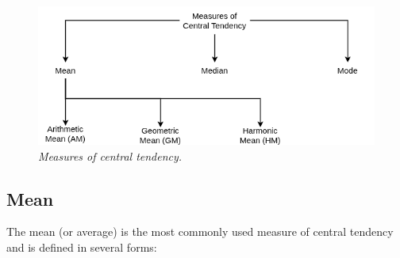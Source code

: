 \documentclass[twoside]{book}
\begin{document}



\begin{figure}[H]
\begin{center}
    \includegraphics[scale=0.56]{pic/moct.drawio.png}
\end{center}
\caption{\textit{Measures of central tendency.}}
\end{figure}


\subsection{Mean}

The mean (or average) is the most commonly used measure of central tendency and is defined in several forms:
\end{document}

